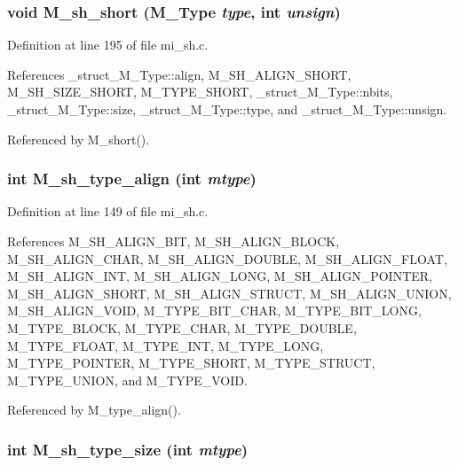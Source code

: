 \subsubsection{\setlength{\rightskip}{0pt plus 5cm}void M\_\-sh\_\-short (\bf{M\_\-Type} {\em type}, int {\em unsign})}\label{mi__sh_8c_9a55fa64720962195847c116f4c7143d}




Definition at line 195 of file mi\_\-sh.c.

References \_\-struct\_\-M\_\-Type::align, M\_\-SH\_\-ALIGN\_\-SHORT, M\_\-SH\_\-SIZE\_\-SHORT, M\_\-TYPE\_\-SHORT, \_\-struct\_\-M\_\-Type::nbits, \_\-struct\_\-M\_\-Type::size, \_\-struct\_\-M\_\-Type::type, and \_\-struct\_\-M\_\-Type::unsign.

Referenced by M\_\-short().
\subsubsection{\setlength{\rightskip}{0pt plus 5cm}int M\_\-sh\_\-type\_\-align (int {\em mtype})}\label{mi__sh_8c_10e7d0c8a90ef77b55640a652fe59586}




Definition at line 149 of file mi\_\-sh.c.

References M\_\-SH\_\-ALIGN\_\-BIT, M\_\-SH\_\-ALIGN\_\-BLOCK, M\_\-SH\_\-ALIGN\_\-CHAR, M\_\-SH\_\-ALIGN\_\-DOUBLE, M\_\-SH\_\-ALIGN\_\-FLOAT, M\_\-SH\_\-ALIGN\_\-INT, M\_\-SH\_\-ALIGN\_\-LONG, M\_\-SH\_\-ALIGN\_\-POINTER, M\_\-SH\_\-ALIGN\_\-SHORT, M\_\-SH\_\-ALIGN\_\-STRUCT, M\_\-SH\_\-ALIGN\_\-UNION, M\_\-SH\_\-ALIGN\_\-VOID, M\_\-TYPE\_\-BIT\_\-CHAR, M\_\-TYPE\_\-BIT\_\-LONG, M\_\-TYPE\_\-BLOCK, M\_\-TYPE\_\-CHAR, M\_\-TYPE\_\-DOUBLE, M\_\-TYPE\_\-FLOAT, M\_\-TYPE\_\-INT, M\_\-TYPE\_\-LONG, M\_\-TYPE\_\-POINTER, M\_\-TYPE\_\-SHORT, M\_\-TYPE\_\-STRUCT, M\_\-TYPE\_\-UNION, and M\_\-TYPE\_\-VOID.

Referenced by M\_\-type\_\-align().
\subsubsection{\setlength{\rightskip}{0pt plus 5cm}int M\_\-sh\_\-type\_\-size (int {\em mtype})}\label{mi__sh_8c_8e8abdcec626b5032f0139743cba5d97}




